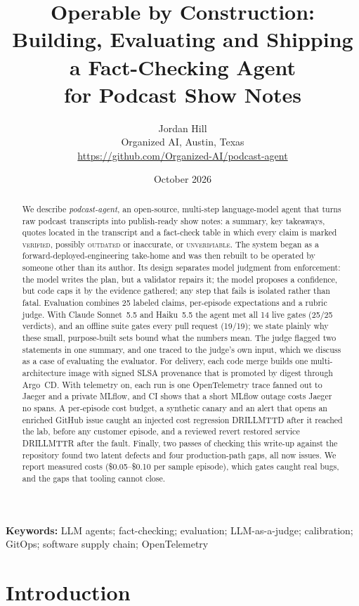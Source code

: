 \documentclass[11pt]{article}
\title{\textbf{Operable by Construction:\\ Building, Evaluating and Shipping a Fact-Checking Agent\\ for Podcast Show Notes}}
\author{Jordan Hill\\[2pt]
  \normalsize Organized AI, Austin, Texas\\[2pt]
  \normalsize\url{https://github.com/Organized-AI/podcast-agent}}
\date{October 2026}
\newcommand{\V}{\textsc{verified}}
\newcommand{\Ou}{\textsc{outdated}}
\newcommand{\U}{\textsc{unverifiable}}
\newcommand{\drillmttd}{DRILLMTTD}
\newcommand{\drillmttr}{DRILLMTTR}
\begin{document}
\maketitle
\thispagestyle{fancy}

\begin{abstract}
\noindent
We describe \emph{podcast-agent}, an open-source, multi-step language-model agent that turns raw podcast transcripts into publish-ready show notes: a summary, key takeaways, quotes located in the transcript and a fact-check table in which every claim is marked \V{}, possibly \Ou{} or inaccurate, or \U{}. The system began as a forward-deployed-engineering take-home and was then rebuilt to be operated by someone other than its author. Its design separates model judgment from enforcement: the model writes the plan, but a validator repairs it; the model proposes a confidence, but code caps it by the evidence gathered; any step that fails is isolated rather than fatal. Evaluation combines 25 labeled claims, per-episode expectations and a rubric judge. With Claude Sonnet~5.5 and Haiku~5.5 the agent met all 14 live gates (25/25 verdicts), and an offline suite gates every pull request (19/19); we state plainly why these small, purpose-built sets bound what the numbers mean. The judge flagged two statements in one summary, and one traced to the judge's own input, which we discuss as a case of evaluating the evaluator. For delivery, each code merge builds one multi-architecture image with signed SLSA provenance that is promoted by digest through Argo~CD. With telemetry on, each run is one OpenTelemetry trace fanned out to Jaeger and a private MLflow, and CI shows that a short MLflow outage costs Jaeger no spans. A per-episode cost budget, a synthetic canary and an alert that opens an enriched GitHub issue caught an injected cost regression \drillmttd{} after it reached the lab, before any customer episode, and a reviewed revert restored service \drillmttr{} after the fault. Finally, two passes of checking this write-up against the repository found two latent defects and four production-path gaps, all now issues. We report measured costs (\$0.05--\$0.10 per sample episode), which gates caught real bugs, and the gaps that tooling cannot close.
\end{abstract}

\noindent\textbf{Keywords:} LLM agents; fact-checking; evaluation; LLM-as-a-judge; calibration; GitOps; software supply chain; OpenTelemetry

\section{Introduction}
\end{document}
